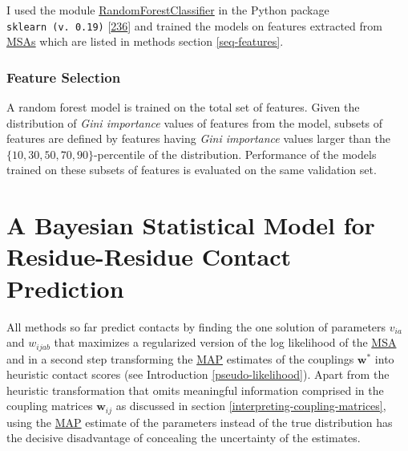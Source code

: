 \documentclass[11pt,a4paper,twoside]{book}
\newcommand{\via}{v_{ia}}
\newcommand{\w}{\mathbf{w}}
\newcommand{\wij}{\mathbf{w}_{ij}}
\newcommand{\wijab}{w_{ijab}}
\theoremstyle{definition}
\theoremstyle{definition}
\theoremstyle{remark}
\begin{document}
I used the module
\href{http://scikit-learn.org/stable/modules/generated/sklearn.ensemble.RandomForestClassifier.html\#sklearn.ensemble.RandomForestClassifier}{RandomForestClassifier}
in the Python package \texttt{sklearn\ (v.\ 0.19)}
{[}\protect\hyperlink{ref-Pedregosa2011}{236}{]} and trained the models
on features extracted from \protect\hyperlink{abbrev}{MSAs} which are
listed in methods section \ref{seq-features}.

\subsection{Feature Selection}\label{rf-feature-selection}

A random forest model is trained on the total set of features. Given the
distribution of \emph{Gini importance} values of features from the
model, subsets of features are defined by features having \emph{Gini
importance} values larger than the \(\{10, 30, 50, 70, 90\}\)-percentile
of the distribution. Performance of the models trained on these subsets
of features is evaluated on the same validation set.

\chapter{A Bayesian Statistical Model for Residue-Residue Contact
Prediction}\label{bayesian-approach}

All methods so far predict contacts by finding the one solution of
parameters \(\via\) and \(\wijab\) that maximizes a regularized version
of the log likelihood of the \protect\hyperlink{abbrev}{MSA} and in a
second step transforming the \protect\hyperlink{abbrev}{MAP} estimates
of the couplings \(\w^*\) into heuristic contact scores (see
Introduction \ref{pseudo-likelihood}). Apart from the heuristic
transformation that omits meaningful information comprised in the
coupling matrices \(\wij\) as discussed in section
\ref{interpreting-coupling-matrices}, using the
\protect\hyperlink{abbrev}{MAP} estimate of the parameters instead of
the true distribution has the decisive disadvantage of concealing the
uncertainty of the estimates.
\end{document}
